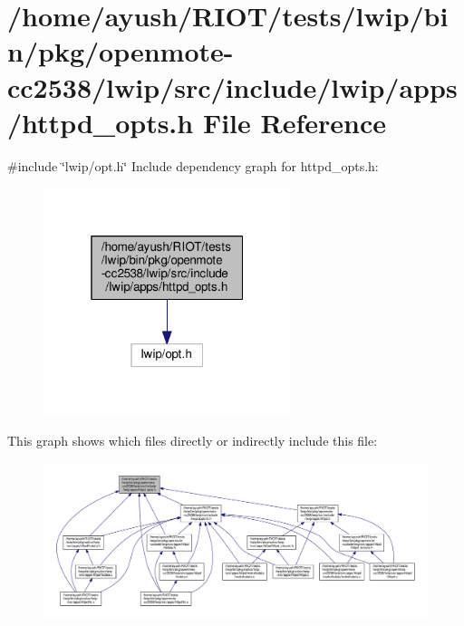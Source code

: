\hypertarget{openmote-cc2538_2lwip_2src_2include_2lwip_2apps_2httpd__opts_8h}{}\section{/home/ayush/\+R\+I\+O\+T/tests/lwip/bin/pkg/openmote-\/cc2538/lwip/src/include/lwip/apps/httpd\+\_\+opts.h File Reference}
\label{openmote-cc2538_2lwip_2src_2include_2lwip_2apps_2httpd__opts_8h}
{\ttfamily \#include \char`\"{}lwip/opt.\+h\char`\"{}}\newline
Include dependency graph for httpd\+\_\+opts.\+h\+:
\nopagebreak
\begin{figure}[H]
\begin{center}
\leavevmode
\includegraphics[width=205pt]{openmote-cc2538_2lwip_2src_2include_2lwip_2apps_2httpd__opts_8h__incl}
\end{center}
\end{figure}
This graph shows which files directly or indirectly include this file\+:
\nopagebreak
\begin{figure}[H]
\begin{center}
\leavevmode
\includegraphics[width=350pt]{openmote-cc2538_2lwip_2src_2include_2lwip_2apps_2httpd__opts_8h__dep__incl}
\end{center}
\end{figure}
